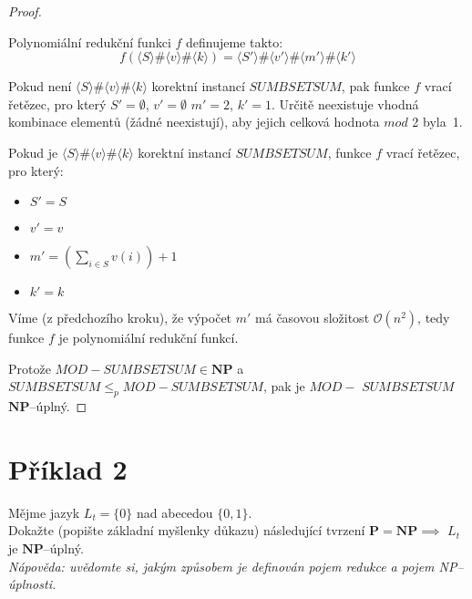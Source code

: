 \documentclass[a4paper, 11pt, fleqn]{scrartcl}
\begin{document}
\begin{proof}
\begin{adjustwidth}{1em}{0em}
        Polynomiální redukční funkci $f$ definujeme takto:\\
        $$f(\langle S \rangle \# \langle v \rangle \# \langle k \rangle) = \langle S' \rangle \# \langle v' \rangle \# \langle m' \rangle \# \langle k' \rangle$$

        Pokud není $\langle S \rangle \# \langle v \rangle \# \langle k \rangle$ korektní instancí $\mathit{SUMBSETSUM}$, pak funkce $f$ vrací řetězec, pro který $S' = \emptyset$, $v' = \emptyset$ $m' = 2$, $k' = 1$. Určitě neexistuje vhodná kombinace elementů (žádné neexistují), aby jejich celková hodnota $\textit{mod}$ 2 byla~1.

        \newpage
        Pokud je $\langle S \rangle \# \langle v \rangle \# \langle k \rangle$ korektní instancí $\mathit{SUMBSETSUM}$, funkce $f$ vrací řetězec, pro který:
        \begin{itemize}
          \item $S' = S$
          \item $v' = v$
          \item $m' = \left( \sum_{i \in S}v(i) \right) + 1$
          \item $k' = k$
        \end{itemize}

        Víme (z předchozího kroku), že výpočet $m'$ má časovou složitost $\mathcal{O}(n^2)$, tedy funkce $f$ je polynomiální redukční funkcí.
      \end{adjustwidth}

      Protože $\mathit{MOD-SUMBSETSUM} \in \mathbf{NP}$ a $\mathit{SUMBSETSUM} \leq_p \mathit{MOD-SUMBSETSUM}$, pak je $\mathit{MOD-}$ $\mathit{SUMBSETSUM}$ $\mathbf{NP}$--úplný.
  \end{proof}


 \section*{Příklad 2}
  Mějme jazyk $L_t = \{0\}$ nad abecedou $\{0,1\}$.\\

  Dokažte (popište základní myšlenky důkazu) následující tvrzení $\mathbf{P} = \mathbf{NP} \implies$ $L_t$ je $\mathbf{NP}$--úplný.\\
  \textit{Nápověda: uvědomte si, jakým způsobem je definován pojem redukce a pojem NP--úplnosti.}
\end{document}
